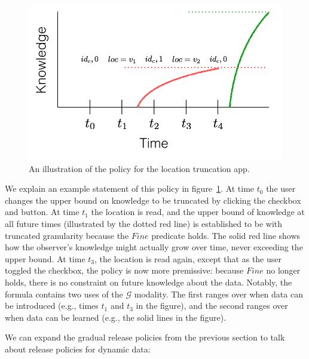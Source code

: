 \documentclass[conference]{IEEEtran}
\theoremstyle{definition}
\newcommand{\talways}{\mathcal{G}}
\begin{document}
\begin{figure}
\includegraphics[width=\linewidth]{knowledge-time-graph}
\caption{An illustration of the policy for the location truncation
  app.}
\label{fig:knowledge-time-graph}
\end{figure}

We explain an example statement of this policy in
figure~\ref{fig:knowledge-time-graph}.  At time $t_0$ the user changes
the upper bound on knowledge to be truncated by clicking the checkbox
and button.  At time $t_1$ the location is read, and the upper bound
of knowledge at all future times (illustrated by the dotted red line)
is established to be with truncated granularity because the $Fine$
predicate holds.  The solid red line shows how the observer's
knowledge might actually grow over time, never exceeding the upper
bound.  At time $t_3$, the location is read again, except that as the
user toggled the checkbox, the policy is now more premissive: because
$Fine$ no longer holds, there is no constraint on future knowledge
about the data.  Notably, the formula contains two uses of the
$\talways$ modality.  The first ranges over when data can be
introduced (e.g., times $t_1$ and $t_3$ in the figure), and the second
ranges over when data can be learned (e.g., the solid lines in the
figure).

We can expand the gradual release policies from the previous section
to talk about release policies for dynamic data:
\end{document}
